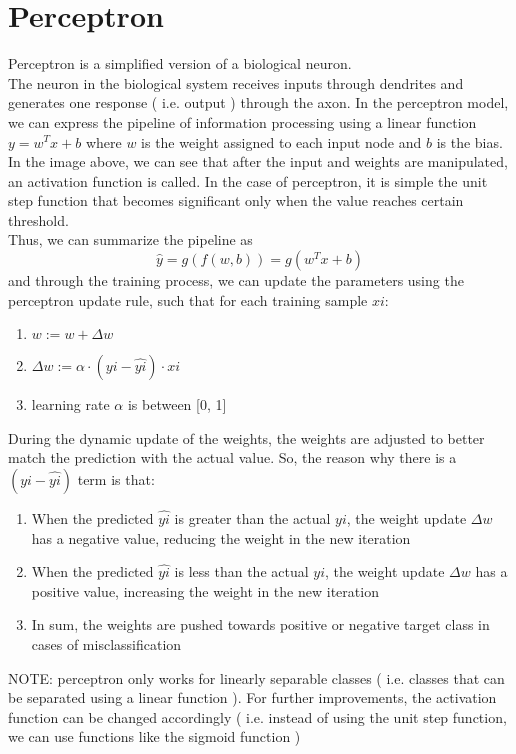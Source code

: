 \documentclass[12pt]{article}
\begin{document}
\section{Perceptron}
Perceptron is a simplified version of a biological neuron.\\
The neuron in the biological system receives inputs through dendrites and generates one response (  i.e. output  ) through the axon. In the perceptron model, we can express the pipeline of information processing using a linear function $y = w^Tx + b$ where $w$ is the weight assigned to each input node and $b$ is the bias. In the image above, we can see that after the input and weights are manipulated, an activation function is called. In the case of perceptron, it is simple the   unit step function   that becomes significant only when the value reaches certain threshold.\\
Thus, we can summarize the pipeline as $$\hat{y} = g(f(w, b)) = g(w^Tx + b)$$ and through the training process, we can update the parameters using the perceptron update rule, such that for each training sample $x  i$:
\begin{enumerate}
	\item $w := w + \Delta w$
	\item $\Delta w := \alpha \cdot (y  i - \hat{y  i})\cdot x  i$
	\item learning rate $\alpha$ is between [0, 1]
\end{enumerate}
During the dynamic update of the weights, the weights are adjusted to better match the prediction with the actual value. So, the reason why there is a $(y  i - \hat{y  i})$ term is that:
\begin{enumerate}
	\item When the predicted $\hat{y  i}$ is greater than the actual $y  i$, the weight update $\Delta w$ has a negative value, reducing the weight in the new iteration
	\item When the predicted $\hat{y  i}$ is less than the actual $y  i$, the weight update $\Delta w$ has a positive value, increasing the weight in the new iteration
	\item In sum, the weights are pushed towards positive or negative target class in cases of misclassification  
\end{enumerate}
NOTE: perceptron only works for linearly separable classes (  i.e. classes that can be separated using a linear function  ). For further improvements, the activation function can be changed accordingly (  i.e. instead of using the unit step function, we can use functions like the sigmoid function  )
\end{document}
